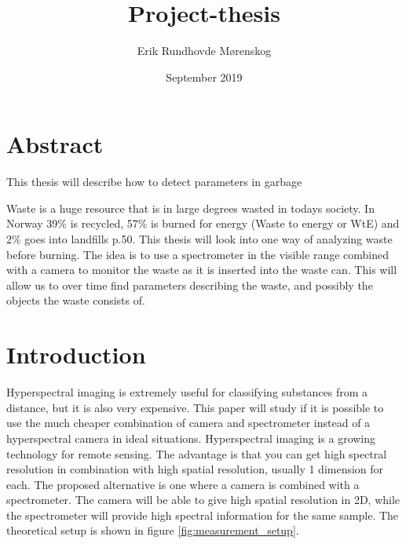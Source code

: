 \documentclass{article}
\title{Project-thesis}
\author{Erik Rundhovde M\o renskog}
\date{September 2019}
\begin{document}
\maketitle

\tableofcontents

\section{Abstract}
This thesis will describe how to detect parameters in garbage 

Waste is a huge resource that is in large degrees wasted in todays society. In Norway 39\% is recycled, 57\% is burned for energy (Waste to energy or WtE) and 2\% goes into landfills \cite{EnvironmentGlance20152015} p.50. This thesis will look into one way of analyzing waste before burning. The idea is to use a spectrometer in the visible range combined with a camera to monitor the waste as it is inserted into the waste can. This will allow us to over time find parameters describing the waste, and possibly the objects the waste consists of. 


\section{Introduction}
Hyperspectral imaging is extremely useful for classifying substances from a distance, but it is also very expensive. This paper will study if it is possible to use the much cheaper combination of camera and spectrometer instead of a hyperspectral camera in ideal situations. 
Hyperspectral imaging is a growing technology for remote sensing. The advantage is that you can get high spectral resolution in combination with high spatial resolution, usually 1 dimension for each. The proposed alternative is one where a camera is combined with a spectrometer. The camera will be able to give high spatial resolution in 2D, while the spectrometer will provide high spectral information for the same sample. The theoretical setup is shown in figure \ref{fig:measurement_setup}. 
\end{document}
